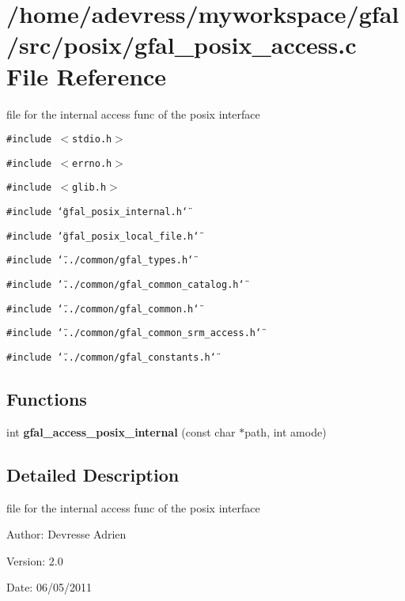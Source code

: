 \section{/home/adevress/myworkspace/gfal/src/posix/gfal\_\-posix\_\-access.c File Reference}
\label{gfal__posix__access_8c}
file for the internal access func of the posix interface 

{\tt \#include $<$stdio.h$>$}\par
{\tt \#include $<$errno.h$>$}\par
{\tt \#include $<$glib.h$>$}\par
{\tt \#include \char`\"{}gfal\_\-posix\_\-internal.h\char`\"{}}\par
{\tt \#include \char`\"{}gfal\_\-posix\_\-local\_\-file.h\char`\"{}}\par
{\tt \#include \char`\"{}../common/gfal\_\-types.h\char`\"{}}\par
{\tt \#include \char`\"{}../common/gfal\_\-common\_\-catalog.h\char`\"{}}\par
{\tt \#include \char`\"{}../common/gfal\_\-common.h\char`\"{}}\par
{\tt \#include \char`\"{}../common/gfal\_\-common\_\-srm\_\-access.h\char`\"{}}\par
{\tt \#include \char`\"{}../common/gfal\_\-constants.h\char`\"{}}\par
\subsection*{Functions}
\begin{CompactItemize}
\item 
int \textbf{gfal\_\-access\_\-posix\_\-internal} (const char $\ast$path, int amode)\label{gfal__posix__access_8c_e288018cbd997767a304ea2a29b1dda4}

\end{CompactItemize}


\subsection{Detailed Description}
file for the internal access func of the posix interface 

\begin{Desc}
\item[Author:]Devresse Adrien \end{Desc}
\begin{Desc}
\item[Version:]2.0 \end{Desc}
\begin{Desc}
\item[Date:]06/05/2011 \end{Desc}
